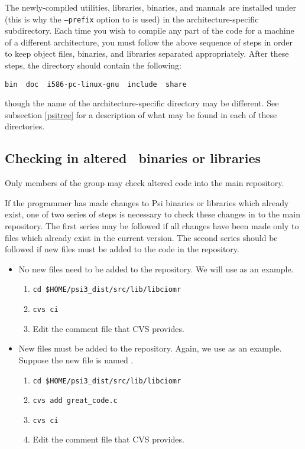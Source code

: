 The newly-compiled utilities, libraries, binaries, and manuals
are installed under 
(this is why the {\tt --prefix} option to  is used) in the architecture-specific
subdirectory. Each time you wish to compile any part of the code for a machine
of a different architecture, you must follow the above sequence of steps in order
to keep object files, binaries, and libraries separated appropriately. After these
steps, the  directory should contain the following: 
\begin{verbatim}
bin  doc  i586-pc-linux-gnu  include  share
\end{verbatim}
though the name of the architecture-specific directory may be different. See
subsection \ref{psitree} for a description of what may be found
in each of these directories. 

\subsection{Checking in altered \PSIthree\ binaries or libraries}
Only members of the  group may check altered code into the main
repository.

If the programmer has made changes to Psi binaries or libraries which already
exist, one of two series of steps is necessary to check these changes in to the
main repository. The first series may be followed if all changes have been made
only to files which already exist in the current version. The second series should
be followed if new files must be added to the code in the repository.
\begin{itemize}
\item No new files need to be added to the repository. We will use
 as an example. 
\begin{enumerate}
\item {\tt cd \$HOME/psi3\_dist/src/lib/libciomr}
\item {\tt cvs ci}
\item Edit the comment file that CVS provides. 
\end{enumerate}
\item New files must be added to the repository. Again, we use 
as an example. Suppose the new file is named  .
\begin{enumerate}
\item {\tt cd \$HOME/psi3\_dist/src/lib/libciomr} 
\item {\tt cvs add great\_code.c} 
\item {\tt cvs ci}
\item Edit the comment file that CVS provides.
\end{enumerate}
\end{itemize}

